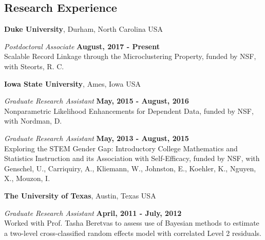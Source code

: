 \documentclass[margin,line]{res}
\begin{document}
\begin{resume}
\section{\sc Research Experience}
{\bf Duke University}, Durham, North Carolina USA

\vspace{-.3cm}
{\em Postdoctoral Associate} \hfill {\bf August, 2017 - Present}\\
Scalable Record Linkage through the Microclustering Property, funded by NSF, with Steorts, R. C.

{\bf Iowa State University}, Ames, Iowa USA

\vspace{-.3cm}

{\em Graduate Research Assistant} \hfill {\bf May, 2015 - August, 2016}\\
Nonparametric Likelihood Enhancements for Dependent Data, funded by NSF, with Nordman, D.

{\em Graduate Research Assistant} \hfill {\bf May, 2013 - August, 2015}\\
Exploring the STEM Gender Gap: Introductory College Mathematics and Statistics Instruction and its Association with Self-Efficacy, funded by NSF, with Genschel, U., Carriquiry, A., Kliemann, W., Johnston, E., Koehler, K., Nguyen, X., Mouzon, I.

{\bf The University of Texas}, Austin, Texas USA

\vspace{-.3cm}
{\em Graduate Research Assistant} \hfill {\bf April, 2011 - July, 2012}\\
Worked with Prof. Tasha Beretvas to assess use of Bayesian methods to estimate a two-level cross-classified random effects model with correlated Level 2 residuals.





\end{resume}
\end{document}
